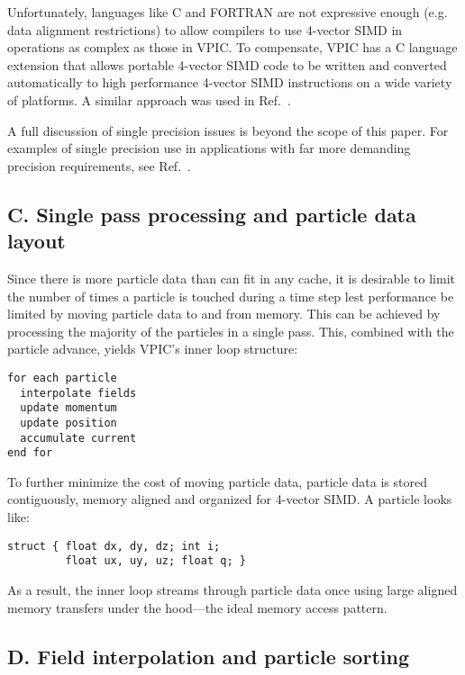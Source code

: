 \documentclass[letter,10pt]{article}
\begin{document}
Unfortunately, languages like C and FORTRAN are not expressive enough
(e.g. data alignment restrictions) to allow compilers to use 4-vector
SIMD in operations as complex as those in VPIC.  To compensate, VPIC
has a C language extension that allows portable 4-vector SIMD code to
be written and converted automatically to high performance 4-vector
SIMD instructions on a wide variety of platforms.  A similar approach
was used in Ref.~\cite{Bowers_et_al_2006}.

A full discussion of single precision issues is beyond the scope of
this paper.  For examples of single precision use in applications with
far more demanding precision requirements, see
Ref.~\cite{Bowers_et_al_2006,Lippert_et_al_2007}.

\subsection{C. Single pass processing and particle data layout}

Since there is more particle data than can fit in any cache, it is
desirable to limit the number of times a particle is touched during a
time step lest performance be limited by moving particle data to and
from memory.  This can be achieved by processing the majority of the
particles in a single pass.  This, combined with the particle advance,
yields VPIC's inner loop structure:
\begin{verbatim}
for each particle
  interpolate fields
  update momentum
  update position
  accumulate current
end for
\end{verbatim}

To further minimize the cost of moving particle data, particle data is
stored contiguously, memory aligned and organized for 4-vector SIMD.
A particle looks like:
\begin{verbatim}
struct { float dx, dy, dz; int i;
         float ux, uy, uz; float q; }
\end{verbatim}
As a result, the inner loop streams through particle data once using
large aligned memory transfers under the hood---the ideal memory
access pattern.

\subsection{D. Field interpolation and particle sorting}
\end{document}
